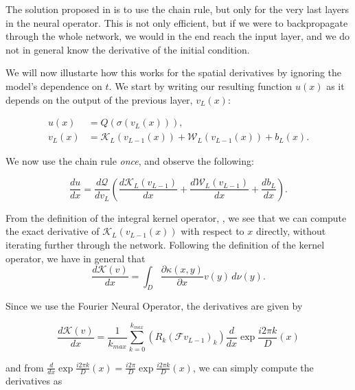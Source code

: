 The solution proposed in \cite{liPhysicsInformedNeuralOperator2023} is to use the chain rule, but only for the very last layers in the neural operator.
This is not only efficient, but if we were to backpropagate through the whole network, we would in the end reach the input layer, and we do not in general know the derivative of the initial condition.

We will now illustarte how this works for the spatial derivatives by ignoring the model's dependence on \(t\). We start by writing our resulting function \(u(x)\) as it depends on the output of the previous 
layer, \(v_L(x)\):

\begin{equation}
    \begin{aligned}
        u(x) &= Q(\sigma(v_L(x))),\\
        v_L(x) &= \mathcal{K}_L(v_{L-1}(x)) + \mathcal{W}_L(v_{L-1}(x))  + b_L(x).
    \end{aligned}
\end{equation}

We now use the chain rule \textit{once}, and observe the following:

\begin{equation}
    \frac{d u}{d x} = 
    \frac{d \mathcal{Q}}{d v_L}
    \left(\frac{d \mathcal{K}_L(v_{L-1})}{dx} + \frac{d \mathcal{W}_L(v_{L-1})}{dx} +\frac{d b_L}{dx}\right).
\end{equation}

From the definition of the integral kernel operator, , we see that we can compute the exact derivative of \(\mathcal{K}_L(v_{L-1}(x))\) with respect to \(x\) 
directly, without iterating further through the network. Following the definition of the kernel operator, we have in general that
\begin{equation}
    \frac{d \mathcal{K} (v)}{dx} = \int_D \frac{\partial \kappa(x,y)}{\partial x} v(y) \, d \nu(y).
\end{equation}

Since we use the Fourier Neural Operator, the derivatives are given by 

\begin{equation}
    \frac{d \mathcal{K} (v)}{dx} = \frac{1}{k_{max}} \sum_{k=0}^{k_{max}} (R_k (\mathcal{F} v_{L-1})_k)  \frac{d}{dx}  \exp{\frac{i 2 \pi k}{D}(x)} 
\end{equation}

and from \(\frac{d}{dx} \exp{\frac{i 2 \pi k}{D}(x)}=\frac{i 2 \pi }{D}\exp{\frac{i 2 \pi k}{D}(x)}\), we can simply compute the derivatives as

